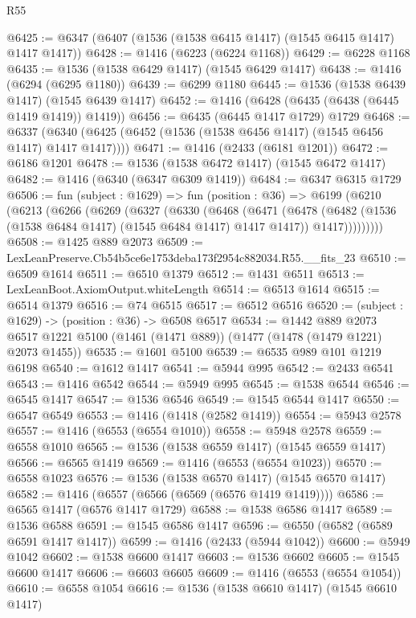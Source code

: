 \begin{lexlean}{R55}
\begin{coremodule}
{{@6425 := @6347 (@6407 (@1536 (@1538 @6415 @1417) (@1545 @6415 @1417) @1417 @1417))
@6428 := @1416 (@6223 (@6224 @1168))
@6429 := @6228 @1168
@6435 := @1536 (@1538 @6429 @1417) (@1545 @6429 @1417)
@6438 := @1416 (@6294 (@6295 @1180))
@6439 := @6299 @1180
@6445 := @1536 (@1538 @6439 @1417) (@1545 @6439 @1417)
@6452 := @1416 (@6428 (@6435 (@6438 (@6445 @1419 @1419)) @1419))
@6456 := @6435 (@6445 @1417 @1729) @1729
@6468 := @6337 (@6340 (@6425 (@6452 (@1536 (@1538 @6456 @1417) (@1545 @6456 @1417) @1417 @1417))))
@6471 := @1416 (@2433 (@6181 @1201))
@6472 := @6186 @1201
@6478 := @1536 (@1538 @6472 @1417) (@1545 @6472 @1417)
@6482 := @1416 (@6340 (@6347 @6309 @1419))
@6484 := @6347 @6315 @1729
@6506 := fun (subject : @1629) =>
  fun (position : @36) =>
  @6199
    (@6210
      (@6213
        (@6266
          (@6269
            (@6327
              (@6330
                (@6468
                  (@6471
                    (@6478
                      (@6482 (@1536 (@1538 @6484 @1417) (@1545 @6484 @1417) @1417 @1417))
                      @1417)))))))))
@6508 := @1425 @889 @2073
@6509 := LexLeanPreserve.Cb54b5ce6e1753deba173f2954c882034.R55.__fits_23
@6510 := @6509 @1614
@6511 := @6510 @1379
@6512 := @1431 @6511
@6513 := LexLeanBoot.AxiomOutput.whiteLength
@6514 := @6513 @1614
@6515 := @6514 @1379
@6516 := @74 @6515
@6517 := @6512 @6516
@6520 := (subject : @1629) -> (position : @36) -> @6508 @6517
@6534 := @1442
    @889
    @2073
    @6517
    @1221
    @5100
    (@1461 (@1471 @889))
    (@1477 (@1478 (@1479 @1221) @2073 @1455))
@6535 := @1601 @5100
@6539 := @6535 @989 @101 @1219 @6198
@6540 := @1612 @1417
@6541 := @5944 @995
@6542 := @2433 @6541
@6543 := @1416 @6542
@6544 := @5949 @995
@6545 := @1538 @6544
@6546 := @6545 @1417
@6547 := @1536 @6546
@6549 := @1545 @6544 @1417
@6550 := @6547 @6549
@6553 := @1416 (@1418 (@2582 @1419))
@6554 := @5943 @2578
@6557 := @1416 (@6553 (@6554 @1010))
@6558 := @5948 @2578
@6559 := @6558 @1010
@6565 := @1536 (@1538 @6559 @1417) (@1545 @6559 @1417)
@6566 := @6565 @1419
@6569 := @1416 (@6553 (@6554 @1023))
@6570 := @6558 @1023
@6576 := @1536 (@1538 @6570 @1417) (@1545 @6570 @1417)
@6582 := @1416 (@6557 (@6566 (@6569 (@6576 @1419 @1419))))
@6586 := @6565 @1417 (@6576 @1417 @1729)
@6588 := @1538 @6586 @1417
@6589 := @1536 @6588
@6591 := @1545 @6586 @1417
@6596 := @6550 (@6582 (@6589 @6591 @1417 @1417))
@6599 := @1416 (@2433 (@5944 @1042))
@6600 := @5949 @1042
@6602 := @1538 @6600 @1417
@6603 := @1536 @6602
@6605 := @1545 @6600 @1417
@6606 := @6603 @6605
@6609 := @1416 (@6553 (@6554 @1054))
@6610 := @6558 @1054
@6616 := @1536 (@1538 @6610 @1417) (@1545 @6610 @1417)
}}
\end{coremodule}
\end{lexlean}
